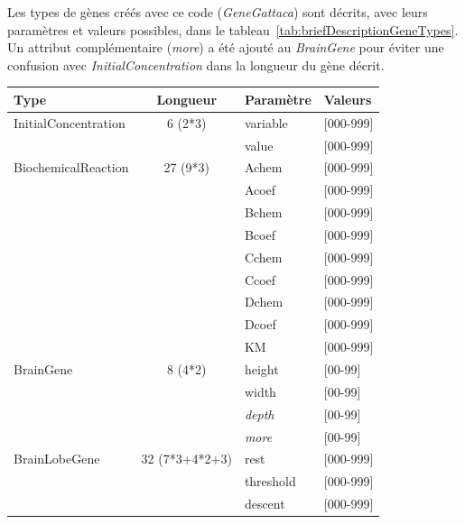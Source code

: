 \documentclass[11pt,twoside,a4paper]{article}
\begin{document}
Les types de g{\`e}nes cr{\'e}{\'e}s avec ce code (\emph{GeneGattaca}) sont d{\'e}crits, avec leurs param{\`e}tres et valeurs possibles, dans le tableau~\ref{tab:briefDescriptionGeneTypes}. Un attribut compl{\'e}mentaire (\textit{more}) a {\'e}t{\'e} ajout{\'e} au \emph{BrainGene} pour {\'e}viter une confusion avec \emph{InitialConcentration} dans la longueur du g{\`e}ne d{\'e}crit.~\\
\begin{table}[h]
	\begin{center} \begin{scriptsize}
	\begin{tabular}{|p{}|c|p{}|p{}|}
\hline
	\rowcolor{lightgray} Type	& Longueur	& Param{\`e}tre	& Valeurs \\ \hline
	InitialConcentration					&	6 (2*3)			&	variable	& [000-999] \\
	\cline{3-4} %
								&				&	value		& [000-999] \\
	\hline \hline
	BiochemicalReaction					&	27 (9*3)		&	Achem		& [000-999] \\
	\cline{3-4} %
								&				&	Acoef		& [000-999] \\
	\cline{3-4} %
								&				&	Bchem		& [000-999] \\
	\cline{3-4} %
								&				&	Bcoef		& [000-999] \\
	\cline{3-4} %
								&				&	Cchem		& [000-999] \\
	\cline{3-4} %
								&				&	Ccoef		& [000-999] \\
	\cline{3-4} %
								&				&	Dchem		& [000-999] \\
	\cline{3-4} %
								&				&	Dcoef		& [000-999] \\
	\cline{3-4} %
								&				&	KM		& [000-999] \\
	\hline \hline
	BrainGene						&	8 (4*2)				&	height		& [00-99] \\
	\cline{3-4} %
								&				&	width		& [00-99] \\
	\cline{3-4} %
								&				&	\textit{depth}	& [00-99] \\
	\cline{3-4} %
								&				&	\textit{more}	& [00-99] \\
	\hline \hline
	BrainLobeGene						& 32 (7*3+4*2+3)&	rest		& [000-999] \\
	\cline{3-4} %
								&				&	threshold	& [000-999] \\
	\cline{3-4} %
								&				&	descent		& [000-999] \\

\end{tabular}
\end{scriptsize}
\end{center}
\end{table}
\end{document}

